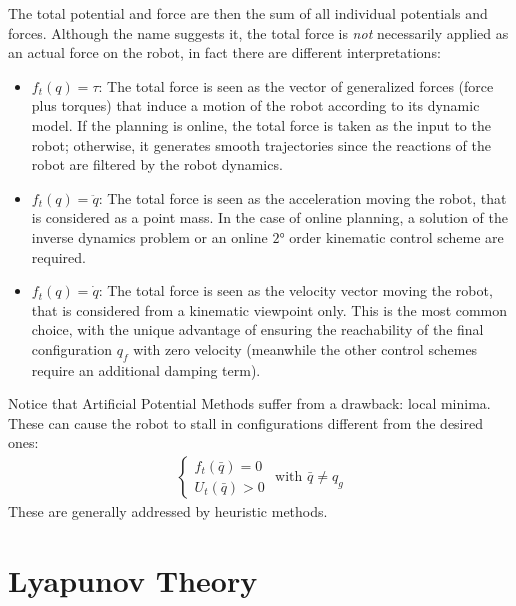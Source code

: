                             The total potential and force are then the sum of all individual potentials and forces. Although the name suggests it, the total force is \textit{not} necessarily applied as an actual force on the robot, in fact there are different interpretations:
                            \begin{itemize}
                                \item $f_t(q)=\tau$: The total force is seen as the vector of generalized forces (force plus torques) that induce a motion of the robot according to its dynamic model. If the planning is online, the total force is taken as the input to the robot; otherwise, it generates smooth trajectories since the reactions of the robot are filtered by the robot dynamics.
                                \item $f_t(q)=\ddot{q}$: The total force is seen as the acceleration moving the robot, that is considered as a point mass. In the case of online planning, a solution of the inverse dynamics problem or an online $2$° order kinematic control scheme are required. 
                                \item $f_t(q)=\dot{q}$: The total force is seen as the velocity vector moving the robot, that is considered from a kinematic viewpoint only. This is the most common choice, with the unique advantage of ensuring the reachability of the final configuration $q_f$ with zero velocity (meanwhile the other control schemes require an additional damping term).
                            \end{itemize}
                            Notice that Artificial Potential Methods suffer from a drawback: local minima. These can cause the robot to stall in configurations different from the desired ones:
                            \begin{gather*}
                                \begin{cases}
                                    f_t(\bar{q})=0\\
                                    U_t(\bar{q})>0
                                \end{cases} \text{ with }\bar{q}\neq q_g
                            \end{gather*}
                            These are generally addressed by heuristic methods.
            \newpage
                \section{Lyapunov Theory}
